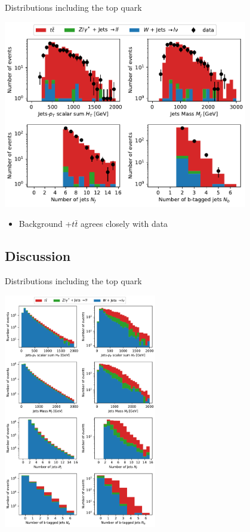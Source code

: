 \documentclass{beamer}
\begin{document}
\begin{frame}{Distributions including the top quark}
\begin{center}
\includegraphics[width=0.8\textwidth]{post_tt.pdf}
\end{center}

\begin{itemize}
    \item<1-> Background +$t\bar{t}$ agrees closely with data
\end{itemize}
\end{frame}

\subsection{Discussion}
\begin{frame}{Distributions including the top quark}
\begin{center}
\includegraphics[width=0.5\textwidth]{mc_tt.pdf}
\end{center}
\end{frame}
\end{document}
